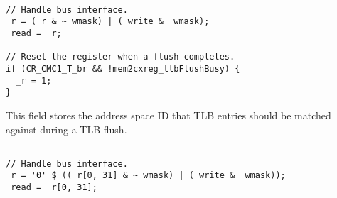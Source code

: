 \declaration{}
\implementation{}
\begin{lstlisting}

// Handle bus interface.
_r = (_r & ~_wmask) | (_write & _wmask);
_read = _r;

// Reset the register when a flush completes.
if (CR_CMC1_T_br && !mem2cxreg_tlbFlushBusy) {
  _r = 1;
}

\end{lstlisting}

This field stores the address space ID that TLB entries should be matched
against during a TLB flush.

\declaration{}
\implementation{}
\begin{lstlisting}

// Handle bus interface.
_r = '0' $ ((_r[0, 31] & ~_wmask) | (_write & _wmask));
_read = _r[0, 31];

\end{lstlisting}

